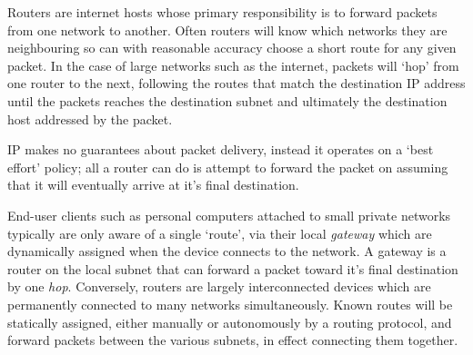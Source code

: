     Routers are internet hosts whose primary responsibility is to forward packets from one network to another. Often routers will know which networks they are neighbouring so can with reasonable accuracy choose a short route for any given packet. In the case of large networks such as the internet, packets will `hop' from one router to the next, following the routes that match the destination IP address until the packets reaches the destination subnet and ultimately the destination host addressed by the packet.

    IP makes no guarantees about packet delivery, instead it operates on a `best effort' policy; all a router can do is attempt to forward the packet on assuming that it will eventually arrive at it's final destination.

    End-user clients such as personal computers attached to small private networks typically are only aware of a single `route', via their local \textit{gateway} which are dynamically assigned when the device connects to the network. A gateway is a router on the local subnet that can forward a packet toward it's final destination by one \textit{hop}.
    Conversely, routers are largely interconnected devices which are permanently connected to many networks simultaneously. Known routes will be statically assigned, either manually or autonomously by a routing protocol, and forward packets between the various subnets, in effect connecting them together.
